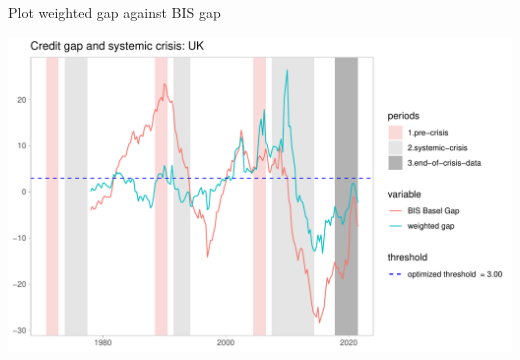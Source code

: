 \documentclass[
  ignorenonframetext,
]{beamer}
\begin{document}
\begin{frame}{Plot weighted gap against BIS gap}
\protect\hypertarget{plot-weighted-gap-against-bis-gap-1}{}
\begin{center}\includegraphics[width=1\linewidth]{../Data/Output/Graphs/Weighted_credit_gap_UK} \end{center}
\end{frame}
\end{document}
